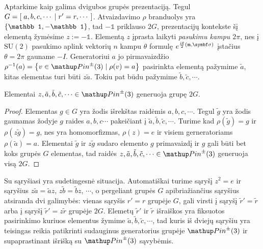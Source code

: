 Aptarkime kaip galima dvigubos grupės prezentaciją.
Tegul $G = \left[\;  a,b,c,\cdots  \;\left|\;  r'=r,\cdots  \;\right.\right]$.
Atvaizdavimo $\rho$ branduolys yra $\qty{\mathbb1,-\mathbb1}$,
tad $-\mathbb1$ priklauso $2G$,
prezentacijų kontekste šį elementą žymėsime $z:=-\mathbb1$.
Elementą $z$ įprasta laikyti \emph{pasukimu kampu $2\pi$},
nes į $\mathup{SU}(2)$ pasukimo aplink vektorių $n$ kampu $\theta$ formulę
$e^{\frac{i\theta}{2}(\vb n,\symbf\sigma)}$
įstačius $\theta = 2\pi$ gauname $-I$.
Generatoriui $a$ jo pirmavaizdžio 
$\rho^{-1}(a) = \qty{ v \in \pinpm \mid \rho(v)=a }$ 
pasirinkta elementą pažymime $\tilde a$,
kitas  elementas turi būti $z\tilde a$.
Tokiu pat būdu pažymime $\tilde b,\tilde c,\cdots$.
\begin{proposition}
	Elementai $z, \tilde a, \tilde b, \tilde c, \cdots \in \pinpm$ generuoja grupę $2G$.
\end{proposition}
\begin{proof}
	Elementas $g \in G$ yra žodis išrekštas raidėmis $a,b,c,\cdots$.
	Tegul $\tilde g$ yra žodis gaunamas žodyje $g$ raides $a, b, c \cdots$
	pakeičiant į $\tilde a, \tilde b, \tilde c, \cdots$.
	Turime kad $\rho(\tilde g) = g$ ir $\rho(z\tilde g)=g$,
	nes \rho yra homomorfizmas, $\rho(z)=e$ ir visiem gerneratoriams $\rho(\tilde a)=a$.
	Elementai $\tilde g$ ir $z\tilde g$ sudaro elemento $g$ primavaizdį
	ir $g$ gali būti bet koks grupės $G$ elementas,
	tad raidės $z, \tilde a, \tilde b, \tilde c, \cdots \in \pinpm$ generuoja visą $2G$.
\end{proof}
Su sąryšiasi yra sudetingesnė situacija.
Automatiškai turime sąryšį $z^2=e$ ir sąryšius $z\tilde a =\tilde a z$, $z\tilde b =\tilde b z$, $\cdots$,
o pergeliant grupės $G$ apibriažiančius sąryšius atsiranda dvi galimybės:
vienas sąryšis $r'=r$ grupėje $G$,
gali virsti į sąryšį $\tilde r'=\tilde r$
arba į sąryšį $\tilde r'=z\tilde r$ grupėje $2G$.
Elemetų $\tilde r'$ ir $\tilde r$ išraiškos yra fiksuotos pasirinkimo
kuriuos elementus žymime $\tilde a, \tilde b, \tilde c, \cdots$,
tad kuris iš dviejų sąryšiu yra teisingas reikia patikrinti sudauginus
generatorius grupėje $\pinpm$ ir supaprastinant išrišką su $\pinpm$ sąvybėmis.






\clearpage{}
